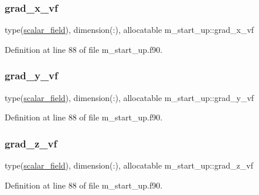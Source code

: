 \subsubsection{\texorpdfstring{grad\+\_\+x\+\_\+vf}{grad\_x\_vf}}
{\footnotesize\ttfamily type(\hyperlink{structm__derived__types_1_1scalar__field}{scalar\+\_\+field}), dimension(\+:), allocatable m\+\_\+start\+\_\+up\+::grad\+\_\+x\+\_\+vf}



Definition at line 88 of file m\+\_\+start\+\_\+up.\+f90.

\mbox{\label{namespacem__start__up_a2e9ad6009d63488a8f8c7a3a548ba433}} 
\subsubsection{\texorpdfstring{grad\+\_\+y\+\_\+vf}{grad\_y\_vf}}
{\footnotesize\ttfamily type(\hyperlink{structm__derived__types_1_1scalar__field}{scalar\+\_\+field}), dimension(\+:), allocatable m\+\_\+start\+\_\+up\+::grad\+\_\+y\+\_\+vf}



Definition at line 88 of file m\+\_\+start\+\_\+up.\+f90.

\mbox{\label{namespacem__start__up_ada153b7f1b2f725b026b89cd187d3206}} 
\subsubsection{\texorpdfstring{grad\+\_\+z\+\_\+vf}{grad\_z\_vf}}
{\footnotesize\ttfamily type(\hyperlink{structm__derived__types_1_1scalar__field}{scalar\+\_\+field}), dimension(\+:), allocatable m\+\_\+start\+\_\+up\+::grad\+\_\+z\+\_\+vf}



Definition at line 88 of file m\+\_\+start\+\_\+up.\+f90.

\mbox{\label{namespacem__start__up_a7744b5bc78146b1334d0c019d83c985e}} 
